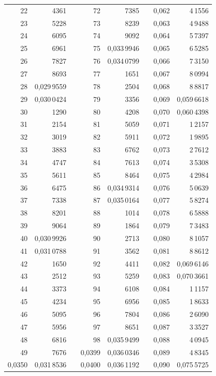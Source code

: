 \begin{tabular}{|r|r|@{}p{9pt}@{}|r|r|@{}p{9pt}@{}|r|r|}
22 & 4361 &  & 72 & 7385 &  & 0,062 & 4\,1556 \\
23 & 5228 &  & 73 & 8239 &  & 0,063 & 4\,9488 \\
24 & 6095 &  & 74 & 9092 &  & 0,064 & 5\,7397 \\
25 & 6961 &  & 75 & 0,033\,9946 &  & 0,065 & 6\,5285 \\[3pt]
26 & 7827 &  & 76 & 0,034\,0799 &  & 0,066 & 7\,3150 \\
27 & 8693 &  & 77 & 1651 &  & 0,067 & 8\,0994 \\
28 & 0,029\,9559 &  & 78 & 2504 &  & 0,068 & 8\,8817 \\
29 & 0,030\,0424 &  & 79 & 3356 &  & 0,069 & 0,059\,6618 \\
30 & 1290 &  & 80 & 4208 &  & 0,070 & 0,060\,4398 \\[3pt]
31 & 2154 &  & 81 & 5059 &  & 0,071 & 1\,2157 \\
32 & 3019 &  & 82 & 5911 &  & 0,072 & 1\,9895 \\
33 & 3883 &  & 83 & 6762 &  & 0,073 & 2\,7612 \\
34 & 4747 &  & 84 & 7613 &  & 0,074 & 3\,5308 \\
35 & 5611 &  & 85 & 8464 &  & 0,075 & 4\,2984 \\[3pt]
36 & 6475 &  & 86 & 0,034\,9314 &  & 0,076 & 5\,0639 \\
37 & 7338 &  & 87 & 0,035\,0164 &  & 0,077 & 5\,8274 \\
38 & 8201 &  & 88 & 1014 &  & 0,078 & 6\,5888 \\
39 & 9064 &  & 89 & 1864 &  & 0,079 & 7\,3483 \\
40 & 0,030\,9926 &  & 90 & 2713 &  & 0,080 & 8\,1057 \\[3pt]
41 & 0,031\,0788 &  & 91 & 3562 &  & 0,081 & 8\,8612 \\
42 & 1650 &  & 92 & 4411 &  & 0,082 & 0,069\,6146 \\
43 & 2512 &  & 93 & 5259 &  & 0,083 & 0,070\,3661 \\
44 & 3373 &  & 94 & 6108 &  & 0,084 & 1\,1157 \\
45 & 4234 &  & 95 & 6956 &  & 0,085 & 1\,8633 \\[3pt]
46 & 5095 &  & 96 & 7804 &  & 0,086 & 2\,6090 \\
47 & 5956 &  & 97 & 8651 &  & 0,087 & 3\,3527 \\
48 & 6816 &  & 98 & 0,035\,9499 &  & 0,088 & 4\,0945 \\
49 & 7676 &  & 0,0399 & 0,036\,0346 &  & 0,089 & 4\,8345 \\
0,0350 & 0,031\,8536 &  & 0,0400 & 0,036\,1192 &  & 0,090 & 0,075\,5725 \\
\hline
\end{tabular}\par
